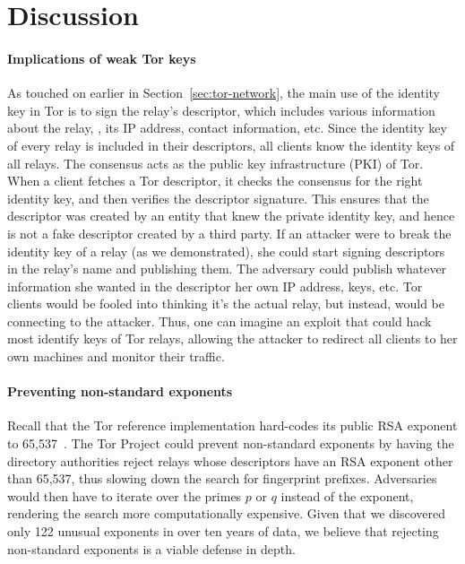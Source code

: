 \section{Discussion}
\label{sec:discussion}
\paragraph{Implications of weak Tor keys}
As touched on earlier in Section~\ref{sec:tor-network}, the main use of the
identity key in Tor is to sign the relay's descriptor, which includes various
information about the relay, \eg, its IP address, contact information, etc.
Since the identity key of every relay is included in their descriptors, all
clients know the identity keys of all relays. The consensus acts as the public
key infrastructure (PKI) of Tor. When a client fetches a Tor descriptor, it
checks the consensus for the right identity key, and then verifies the
descriptor signature. This ensures that the descriptor was created by an entity
that knew the private identity key, and hence is not a fake descriptor created
by a third party. If an attacker were to break the identity key of a relay (as
we demonstrated), she could start signing descriptors in the relay's name and
publishing them. The adversary could publish whatever information she wanted in
the descriptor \eg her own IP address, keys, etc. Tor clients would be fooled
into thinking it's the actual relay, but instead, would be connecting to the
attacker. Thus, one can imagine an exploit that could hack most identify keys of
Tor relays, allowing the attacker to redirect all clients to her own machines
and monitor their traffic.

\paragraph{Preventing non-standard exponents}
Recall that the Tor reference implementation hard-codes its public RSA exponent
to 65,537~\cite[\S~0.3]{torspec}.  The Tor Project could prevent non-standard
exponents by having the directory authorities reject relays whose descriptors
have an RSA exponent other than 65,537, thus slowing down the search for
fingerprint prefixes.  Adversaries would then have to iterate over the primes
$p$ or $q$ instead of the exponent, rendering the search more computationally
expensive.  Given that we discovered only 122 unusual exponents in over ten
years of data, we believe that rejecting non-standard exponents is a viable
defense in depth.

